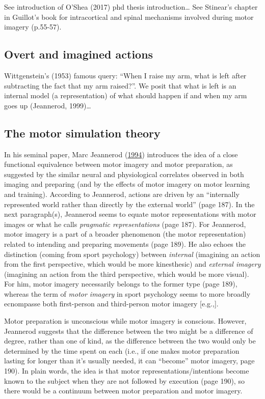 \documentclass[a4paper,12pt,twoside,openright,oldfontcommands]{memoir}
\begin{document}
See introduction of O'Shea (2017) phd thesis introduction\ldots{} See
Stinear's chapter in Guillot's book for intracortical and spinal
mechanisms involved during motor imagery (p.55-57).

\subsection{Overt and imagined
actions}\label{overt-and-imagined-actions}

Wittgenstein's (1953) famous query: ``When I raise my arm, what is left
after subtracting the fact that my arm raised?''. We posit that what is
left is an internal model (a representation) of what should happen if
and when my arm goes up (Jeannerod, 1999)\ldots{}

\subsection{The motor simulation
theory}\label{the-motor-simulation-theory}

In his seminal paper, Marc Jeannerod
(\protect\hyperlink{ref-jeannerod_representing_1994}{1994}) introduces
the idea of a close functional equivalence between motor imagery and
motor preparation, as suggested by the similar neural and physiological
correlates observed in both imaging and preparing (and by the effects of
motor imagery on motor learning and training). According to Jeannerod,
actions are driven by an ``internally represented world rather than
directly by the external world'' (page 187). In the next paragraph(s),
Jeannerod seems to equate motor representations with motor images or
what he calls \emph{pragmatic representations} (page 187). For
Jeannerod, motor imagery is a part of a broader phenomenon (the motor
representation) related to intending and preparing movements (page 189).
He also echoes the distinction (coming from sport psychology) between
\emph{internal} (imagining an action from the first perspective, which
would be more kinesthesic) and \emph{external imagery} (imagining an
action from the third perspective, which would be more visual). For him,
motor imagery necessarily belongs to the former type (page 189), whereas
the term of \emph{motor imagery} in sport psychology seems to more
broadly ecnompasse both first-person and third-person motor imagery
{[}e.g.,{]}.

Motor preparation is unconscious while motor imagery is conscious.
However, Jeannerod suggests that the difference between the two might be
a difference of degree, rather than one of kind, as the difference
between the two would only be determined by the time spent on each
(i.e., if one makes motor preparation lasting for longer than it's
usually needed, it can ``become'' motor imagery, page 190). In plain
words, the idea is that motor representations/intentions become known to
the subject when they are not followed by execution (page 190), so there
would be a continuum between motor preparation and motor imagery.
\end{document}
